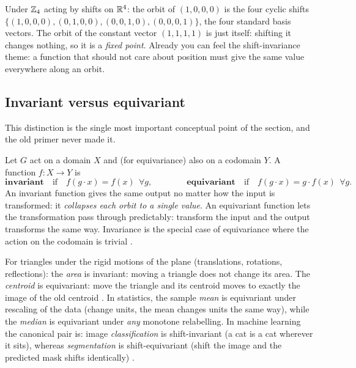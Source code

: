 \begin{example}
\label{ex:orbits4}
Under $\mathbb{Z}_4$ acting by shifts on $\mathbb{R}^4$: the orbit of $(1,0,0,0)$ is the four cyclic
shifts $\{(1,0,0,0),(0,1,0,0),(0,0,1,0),(0,0,0,1)\}$, the four standard basis
vectors. The orbit of the constant vector $(1,1,1,1)$ is just itself: shifting it
changes nothing, so it is a \emph{fixed point}. Already you can feel the
shift-invariance theme: a function that should not care about position must give the
same value everywhere along an orbit.
\end{example}

\subsection{Invariant versus equivariant}

This distinction is the single most important conceptual point of the section, and the
old primer never made it.

\begin{definition}
\label{def:inveq}
Let $G$ act on a domain $X$ and (for equivariance) also on a codomain $Y$. A function
$f : X \to Y$ is
\[
  \textbf{invariant} \quad\text{if}\quad f(g\cdot x) = f(x) \ \ \forall g,
  \qquad\qquad
  \textbf{equivariant} \quad\text{if}\quad f(g\cdot x) = g\cdot f(x) \ \ \forall g .
\]
An invariant function gives the same output no matter how the input is transformed: it
\emph{collapses each orbit to a single value}. An equivariant function lets the
transformation pass through predictably: transform the input and the output transforms
the same way. Invariance is the special case of equivariance where the action on the
codomain is trivial \citep{wiki_equivariant}.
\end{definition}

\begin{example}
\label{ex:areacentroid}
For triangles under the rigid motions of the plane (translations, rotations,
reflections): the \emph{area} is invariant: moving a triangle does not change its
area. The \emph{centroid} is equivariant: move the triangle and its centroid moves
to exactly the image of the old centroid \citep{wiki_equivariant}. In statistics, the
sample \emph{mean} is equivariant under rescaling of the data (change units, the mean
changes units the same way), while the \emph{median} is equivariant under \emph{any}
monotone relabelling. In machine learning the canonical pair is: image
\emph{classification} is shift-invariant (a cat is a cat wherever it sits), whereas
\emph{segmentation} is shift-equivariant (shift the image and the predicted mask shifts
identically) \citep{groups_bronstein}.
\end{example}

